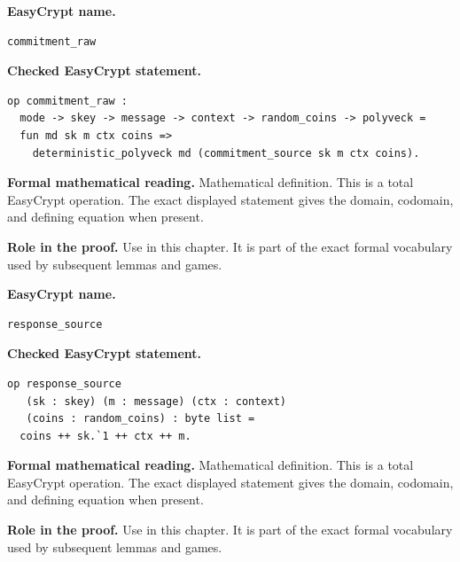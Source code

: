 \begin{formaldefinition}
\noindent\textbf{EasyCrypt name.}
\begin{lstlisting}[language=EasyCrypt,basicstyle=\ttfamily\scriptsize]
commitment_raw
\end{lstlisting}
\noindent\textbf{Checked EasyCrypt statement.}
\begin{lstlisting}[language=EasyCrypt,basicstyle=\ttfamily\scriptsize]
op commitment_raw :
  mode -> skey -> message -> context -> random_coins -> polyveck =
  fun md sk m ctx coins =>
    deterministic_polyveck md (commitment_source sk m ctx coins).
\end{lstlisting}
\noindent\textbf{Formal mathematical reading.}
Mathematical definition. This is a total EasyCrypt operation.  The exact displayed statement gives the domain, codomain, and defining equation when present.

\noindent\textbf{Role in the proof.}
Use in this chapter. It is part of the exact formal vocabulary used by subsequent lemmas and games.

\end{formaldefinition}

\begin{formaldefinition}
\noindent\textbf{EasyCrypt name.}
\begin{lstlisting}[language=EasyCrypt,basicstyle=\ttfamily\scriptsize]
response_source
\end{lstlisting}
\noindent\textbf{Checked EasyCrypt statement.}
\begin{lstlisting}[language=EasyCrypt,basicstyle=\ttfamily\scriptsize]
op response_source
   (sk : skey) (m : message) (ctx : context)
   (coins : random_coins) : byte list =
  coins ++ sk.`1 ++ ctx ++ m.
\end{lstlisting}
\noindent\textbf{Formal mathematical reading.}
Mathematical definition. This is a total EasyCrypt operation.  The exact displayed statement gives the domain, codomain, and defining equation when present.

\noindent\textbf{Role in the proof.}
Use in this chapter. It is part of the exact formal vocabulary used by subsequent lemmas and games.

\end{formaldefinition}

